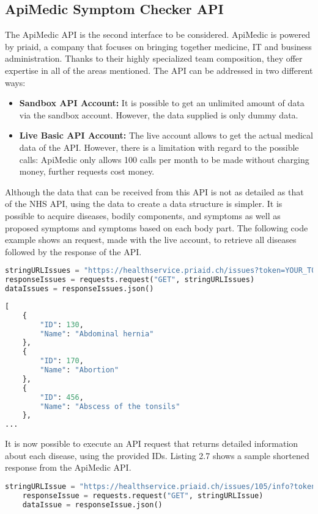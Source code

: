 \subsection{ApiMedic Symptom Checker API}
The ApiMedic API is the second interface to be considered. ApiMedic is powered by priaid, a company that focuses on bringing together medicine, IT and business administration. Thanks to their highly specialized team composition, they offer expertise in all of the areas mentioned. The API can be addressed in two different ways:
\begin{itemize}
	\item \textbf{Sandbox API Account:}
	It is possible to get an unlimited amount of data via the sandbox account. However, the data supplied is only dummy data.
	\item \textbf{Live Basic API Account:}
	The live account allows to get the actual medical data of the API. However, there is a limitation with regard to the possible calls: ApiMedic only allows 100 calls per month to be made without charging money, further requests cost money.
\end{itemize}
Although the data that can be received from this API is not as detailed as that of the NHS API, using the data to create a data structure is simpler. It is possible to acquire diseases, bodily components, and symptoms as well as proposed symptoms and symptoms based on each body part. The following code example shows an request, made with the live account, to retrieve all diseases followed by the response of the API.
\begin{lstlisting}[language=Python, caption={Example Python Request for the ApiMedic API (all issues)}]
stringURLIssues = "https://healthservice.priaid.ch/issues?token=YOUR_TOKEN"
responseIssues = requests.request("GET", stringURLIssues)
dataIssues = responseIssues.json()
\end{lstlisting}

\begin{lstlisting}[language=Python, caption={Response for the ApiMedic API (all issues)}]
[
	{
		"ID": 130,
		"Name": "Abdominal hernia"	
	},
	{
		"ID": 170,
		"Name": "Abortion"	
	},
	{
		"ID": 456,
		"Name": "Abscess of the tonsils"	
	},
...
\end{lstlisting}
It is now possible to execute an API request that returns detailed information about each disease, using the provided IDs. Listing 2.7 shows a sample shortened response from the ApiMedic API.
\begin{lstlisting}[language=Python, caption={Example Python Request for the ApiMedic API (single issue)}]
	stringURLIssue = "https://healthservice.priaid.ch/issues/105/info?token=YOUR_TOKEN"
	responseIssue = requests.request("GET", stringURLIssue)
	dataIssue = responseIssue.json()
\end{lstlisting}

